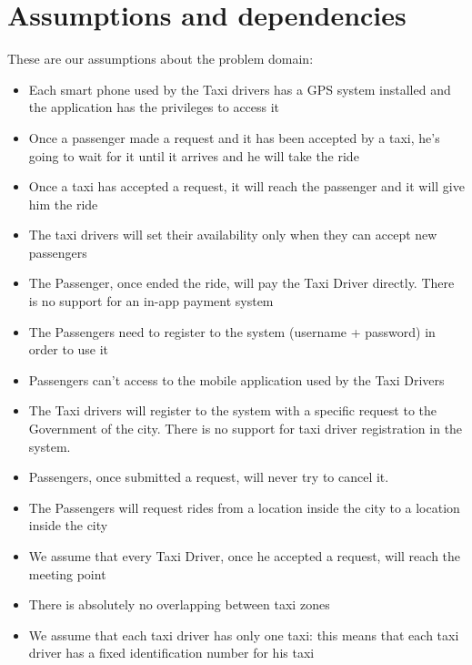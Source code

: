 \section{Assumptions and dependencies}
These are our assumptions about the problem domain:
\begin{itemize}
\item Each smart phone used by the Taxi drivers has a GPS system installed and the application has the privileges to access  it
\item Once a passenger made a request and it has been accepted by a taxi, he's going to wait for it until it arrives and he will take the ride
\item Once a taxi has accepted a request, it will reach the passenger and it will give him the ride
\item The taxi drivers will set their availability only when they can accept new passengers
\item The Passenger, once ended the ride, will pay the Taxi Driver directly. There is no support for an in-app payment system
\item The Passengers need to register to the system (username + password) in order to use it
\item Passengers can't access to the mobile application used by the Taxi Drivers
\item The Taxi drivers will register to the system with a specific request to the Government of the city. There is no support for taxi driver registration in the system.
\item Passengers, once submitted a request, will never try to cancel it.
\item The Passengers will request rides from a location inside the city to a location inside the city
\item We assume that every Taxi Driver, once he accepted a request, will reach the meeting point
\item There is absolutely no overlapping between taxi zones
\item We assume that each taxi driver has only one taxi: this means that each taxi driver has a fixed identification number for his taxi 
\end{itemize}

